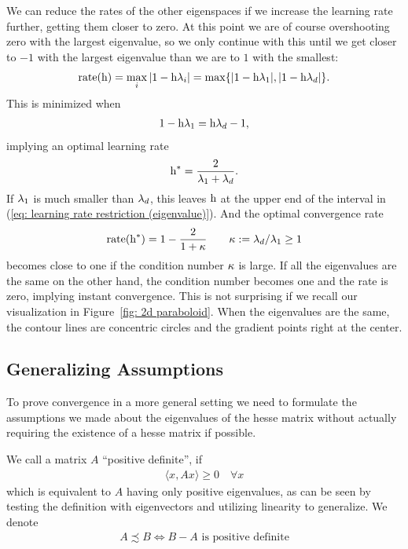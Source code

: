 We can reduce the rates of the other eigenspaces if we
increase the learning rate further, getting them closer to zero. At this point
we are of course overshooting zero with the largest eigenvalue, so we only
continue with this until we get closer to \(-1\) with the largest eigenvalue
than we are to \(1\) with the smallest:
%
\begin{align*}
	\text{rate}(\text{h})=\max_{i} |1-\text{h}\lambda_i| = \max\{|1-\text{h}\lambda_1|, |1-\text{h}\lambda_d|\}.
\end{align*}
%
This is minimized when
%
\begin{align*}
	1-\text{h}\lambda_1 = \text{h}\lambda_d -1,
\end{align*}
%
implying an optimal learning rate
%
\begin{align}\label{eq: optimal SGD lr eigenvalue representation}
	\text{h}^* = \frac{2}{\lambda_1 + \lambda_d}.
\end{align}
%
If \(\lambda_1\) is much smaller than \(\lambda_d\), this leaves \(\text{h}\)
at the upper end of the interval in (\ref{eq: learning rate restriction
(eigenvalue)}). And the optimal convergence rate
%
\begin{align*}
	\text{rate}(\text{h}^*)
	= 1 - \frac{2}{1+\kappa}
	\qquad \kappa:=\lambda_d/\lambda_1 \ge 1
\end{align*}
%
becomes close to one if the condition number \(\kappa\) is large.
If all the eigenvalues are the same on the other hand, the condition number
becomes one and the rate is zero, implying instant convergence. This is not
surprising if we recall our visualization in Figure~\ref{fig: 2d paraboloid}.
When the eigenvalues are the same, the contour lines are concentric circles and
the gradient points right at the center.

\subsection{Generalizing Assumptions}

To prove convergence in a more general setting we need to formulate the assumptions
we made about the eigenvalues of the hesse matrix without actually requiring
the existence of a hesse matrix if possible. 
\begin{definition}
	We call a matrix \(A\) ``positive definite'', if
	\begin{align*}
		\langle x, Ax \rangle \ge 0 \quad \forall x
	\end{align*}
	which is equivalent to \(A\) having only positive eigenvalues, as can be seen
	by testing the definition with eigenvectors and utilizing linearity to generalize.
	We denote
	\begin{align*}
		A \precsim B \iff B-A \text{ is positive definite}
	\end{align*}
\end{definition}

